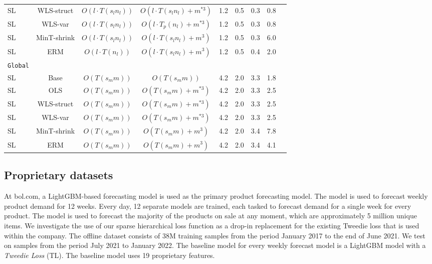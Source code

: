 \documentclass[preprint, 3p, times, twocolumn]{elsarticle}
\begin{document}
\begin{table}[t]
\begin{center}
{\begin{tabular}{l c ccccccc}
    \hspace{0.1cm} 	SL	&WLS-struct	& $O(l \cdot T(s_ln_l))$	&$O(l \cdot T(s_ln_l) + m^{*3})$ &1.2	&0.5	&0.3	&0.8    \\
    \hspace{0.1cm} 	SL	&WLS-var	& $O(l \cdot T(s_ln_l))$	&$O(l \cdot T_p(n_l) + m^{*3})$ &1.2	&0.5	&0.3	&0.8    \\
    \hspace{0.1cm} 	SL	&MinT-shrink & $O(l \cdot T(s_ln_l))$	&$O(l \cdot T(s_ln_l) + m^3)$	&1.2	&0.5	&0.3	&6.0    \\
    \hspace{0.1cm} 	SL	&ERM & $O(l \cdot T(n_l))$	&$O(l \cdot T(s_ln_l) + m^3)$ &1.2	&0.5	&0.4	&2.0    \\
    \midrule																	
    \texttt{Global}																	\\
    \hspace{0.1cm} 	SL	&Base & $O(T(s_mm))$	&$O(T(s_mm))$	&4.2	&2.0	&3.3	&1.8    \\
    \hspace{0.1cm} 	SL	&OLS	& $O(T(s_mm))$	&$O(T(s_mm) + m^{*3})$	&4.2	&2.0	&3.3	&2.5    \\
    \hspace{0.1cm} 	SL	&WLS-struct	& $O(T(s_mm))$	&$O(T(s_mm) + m^{*3})$	&4.2	&2.0	&3.3	&2.5    \\
    \hspace{0.1cm} 	SL	&WLS-var	& $O(T(s_mm))$	&$O(T(s_mm) + m^{*3})$	&4.2	&2.0	&3.3	&2.5    \\
    \hspace{0.1cm} 	SL	&MinT-shrink & $O(T(s_mm))$	&$O(T(s_mm) + m^3)$	&4.2	&2.0	&3.4	&7.8    \\
    \hspace{0.1cm} 	SL	&ERM & $O(T(s_mm))$	&$O(T(s_mm) + m^3)$ &4.2	&2.0	&3.4	&4.1    \\
    \bottomrule
    \end{tabular}}
    \end{center}
    \end{table}
  
  \subsection{Proprietary datasets} \label{subsec:proprietarydatasets}
  At bol.com, a LightGBM-based forecasting model is used as the primary product forecasting model. The model is used to forecast weekly product demand for 12 weeks. Every day, 12 separate models are trained, each tasked to forecast demand for a single week for every product. The model is used to forecast the majority of the products on sale at any moment, which are approximately 5 million unique items. We investigate the use of our sparse hierarchical loss function as a drop-in replacement for the existing Tweedie loss that is used within the company. The offline dataset consists of 38M training samples from the period January 2017 to the end of June 2021. We test on samples from the period July 2021 to January 2022. The baseline model for every weekly forecast model is a LightGBM model with a \textit{Tweedie Loss} (TL). The baseline model uses 19 proprietary features. 
  
\end{document}
